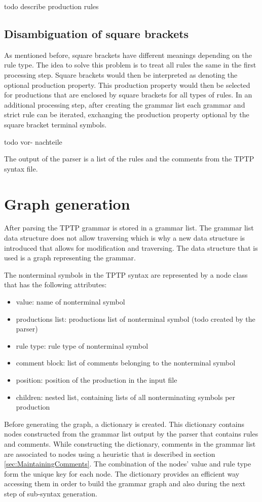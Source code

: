 todo describe production rules

\subsection{Disambiguation of  square brackets}
As mentioned before, square brackets have different meanings depending on the rule type.
The idea to solve this problem is to treat all rules the same in the first processing step.
Square brackets would then be interpreted as denoting the optional production property.
This production property would then be selected for productions that are enclosed by square brackets for all types of rules.
In an additional processing step, after creating the grammar list each grammar and strict rule can be iterated, exchanging the production property optional by the square bracket terminal symbols.

todo vor- nachteile


The output of the parser is a list of the rules and the comments from the \ac{TPTP} syntax file.
\section{Graph generation}\label{sec:ConceptGraphGeneration}
After parsing the TPTP grammar is stored in a grammar list. The grammar list data structure does not allow traversing which is why a new data structure is introduced that allows for modification and traversing.
The data structure that is used is a graph representing the grammar.

The nonterminal symbols in the TPTP syntax are represented by a node class that has the following attributes:
\begin{itemize}
\item value: name of nonterminal symbol
\item productions list: productions list of nonterminal symbol (todo created by the parser)
\item rule type: rule type of nonterminal symbol
\item comment block: list of comments belonging to the nonterminal symbol
\item position: position of the production in the input file
\item children: nested list, containing lists of all nonterminating symbols per production
\end{itemize}

Before generating the graph, a dictionary is created.
This dictionary contains nodes constructed from the grammar list output by the parser that contains rules and comments.
While constructing the dictionary, comments in the grammar list are associated to nodes using a heuristic that is described in section \ref{sec:MaintainingComments}.
The combination of the nodes' value and rule type form the unique key for each node.
The dictionary provides an efficient way accessing them in order to build the grammar graph and also during the next step of sub-syntax generation.


